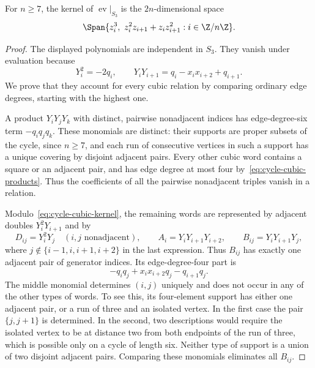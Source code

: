 \begin{lemma}\label{lem:cycle-cubic-kernel}
For $n\ge7$, the kernel of $\operatorname{ev}|_{S_3}$ is the
$2n$-dimensional space
\begin{equation}\label{eq:cycle-cubic-kernel}
 \Span\{z_i^3,\ z_i^2z_{i+1}+z_iz_{i+1}^2:i\in\Z/n\Z\}.
\end{equation}
\end{lemma}
\begin{proof}
The displayed polynomials are independent in $S_3$. They vanish under
evaluation because
\begin{equation}\label{eq:cycle-cubic-products}
 Y_i^2=-2q_i,\qquad
 Y_iY_{i+1}=q_i-x_ix_{i+2}+q_{i+1}.
\end{equation}
We prove that they account for every cubic relation by comparing ordinary
edge degrees, starting with the highest one.

A product $Y_iY_jY_k$ with distinct, pairwise nonadjacent indices has
edge-degree-six term $-q_iq_jq_k$. These monomials are distinct: their
supports are proper subsets of the cycle, since $n\ge7$, and each run
of consecutive vertices in such a support has a unique covering by
disjoint adjacent pairs. Every other cubic word contains a square or
an adjacent pair, and has edge degree at most four
by~\eqref{eq:cycle-cubic-products}. Thus the coefficients of all the
pairwise nonadjacent triples vanish in a relation.

Modulo~\eqref{eq:cycle-cubic-kernel}, the remaining words are represented
by adjacent doubles $Y_i^2Y_{i+1}$ and by
\[
 D_{ij}=Y_i^2Y_j\quad(i,j\text{ nonadjacent}),\qquad
 A_i=Y_iY_{i+1}Y_{i+2},\qquad
 B_{ij}=Y_iY_{i+1}Y_j,
\]
where $j\notin\{i-1,i,i+1,i+2\}$ in the last expression. Thus $B_{ij}$
has exactly one adjacent pair of generator indices. Its edge-degree-four
part is
\[
 -q_iq_j+x_ix_{i+2}q_j-q_{i+1}q_j.
\]
The middle monomial determines $(i,j)$ uniquely and does not occur in
any of the other types of words. To see this, its four-element support
has either one adjacent pair, or a run of three and an isolated vertex.
In the first case the pair $\{j,j+1\}$ is determined. In the second,
two descriptions would require the isolated vertex to be at distance
two from both endpoints of the run of three, which is possible only on
a cycle of length six. Neither type of support is a union of two
disjoint adjacent pairs. Comparing these monomials eliminates all
$B_{ij}$.


\end{proof}
